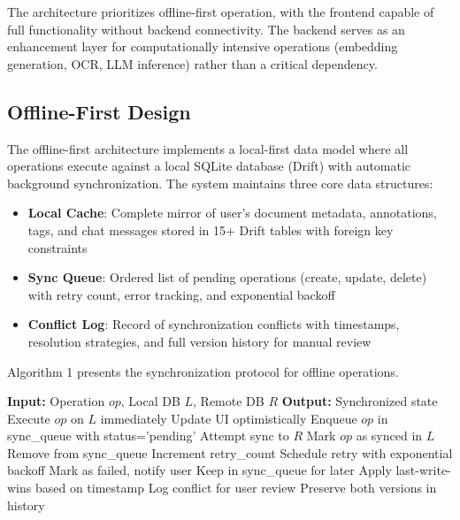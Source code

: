 \documentclass[conference]{IEEEtran}
\begin{document}
The architecture prioritizes offline-first operation, with the frontend capable of full functionality without backend connectivity. The backend serves as an enhancement layer for computationally intensive operations (embedding generation, OCR, LLM inference) rather than a critical dependency.


\subsection{Offline-First Design}

The offline-first architecture implements a local-first data model where all operations execute against a local SQLite database (Drift) with automatic background synchronization. The system maintains three core data structures:

\begin{itemize}
\item \textbf{Local Cache}: Complete mirror of user's document metadata, annotations, tags, and chat messages stored in 15+ Drift tables with foreign key constraints
\item \textbf{Sync Queue}: Ordered list of pending operations (create, update, delete) with retry count, error tracking, and exponential backoff
\item \textbf{Conflict Log}: Record of synchronization conflicts with timestamps, resolution strategies, and full version history for manual review
\end{itemize}

Algorithm 1 presents the synchronization protocol for offline operations.

\begin{algorithm}
\caption{Offline Operation Synchronization}
\begin{algorithmic}[1]
\STATE \textbf{Input:} Operation $op$, Local DB $L$, Remote DB $R$
\STATE \textbf{Output:} Synchronized state
\STATE
\STATE Execute $op$ on $L$ immediately
\STATE Update UI optimistically
\STATE Enqueue $op$ in sync\_queue with status='pending'
\STATE
{}
    \STATE Attempt sync to $R$
        \STATE Mark $op$ as synced in $L$
        \STATE Remove from sync\_queue
    \ELSE
        \STATE Increment retry\_count
        \STATE Schedule retry with exponential backoff
            \STATE Mark as failed, notify user
        \ENDIF
    \ENDIF
\ELSE
    \STATE Keep in sync\_queue for later
\ENDIF
\STATE
{}
    \STATE Apply last-write-wins based on timestamp
    \STATE Log conflict for user review
    \STATE Preserve both versions in history
\ENDIF
\end{algorithmic}
\end{algorithm}
\end{document}

